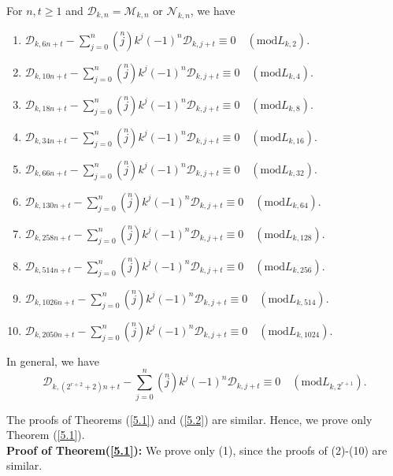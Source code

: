 \begin{theorem}For $n, t\geq 1$ and $\mathcal{D}_{k,n}=\mathcal{M}_{k,n}$ or $\mathcal{N}_{k,n}$, we have\label{5.2}
\begin{enumerate}
\item $\mathcal{D}_{k,6n+t}-\sum\limits_{j=0}^{n}\left( \stackrel{n}{j}\right) k^{j}(-1)^{n} \mathcal{D}_{k,j+t}\equiv 0\quad (\text{mod} L_{k,2}) $.
\item $\mathcal{D}_{k,10n+t}-\sum\limits_{j=0}^{n}\left( \stackrel{n}{j}\right) k^{j}(-1)^{n} \mathcal{D}_{k,j+t}\equiv 0\quad (\text{mod} L_{k,4}) $.
\item $\mathcal{D}_{k,18n+t}-\sum\limits_{j=0}^{n}\left( \stackrel{n}{j}\right) k^{j}(-1)^{n} \mathcal{D}_{k,j+t}\equiv 0\quad (\text{mod} L_{k,8}) $.
\item $\mathcal{D}_{k,34n+t}-\sum\limits_{j=0}^{n}\left( \stackrel{n}{j}\right) k^{j}(-1)^{n} \mathcal{D}_{k,j+t}\equiv 0\quad (\text{mod} L_{k,16}) $.
\item $\mathcal{D}_{k,66n+t}-\sum\limits_{j=0}^{n}\left( \stackrel{n}{j}\right) k^{j}(-1)^{n} \mathcal{D}_{k,j+t}\equiv 0\quad (\text{mod} L_{k,32}) $.
\item $\mathcal{D}_{k,130n+t}-\sum\limits_{j=0}^{n}\left( \stackrel{n}{j}\right) k^{j}(-1)^{n} \mathcal{D}_{k,j+t}\equiv 0\quad (\text{mod} L_{k,64}) $.
\item $\mathcal{D}_{k,258n+t}-\sum\limits_{j=0}^{n}\left( \stackrel{n}{j}\right) k^{j}(-1)^{n} \mathcal{D}_{k,j+t}\equiv 0\quad (\text{mod} L_{k,128}) $.
\item $\mathcal{D}_{k,514n+t}-\sum\limits_{j=0}^{n}\left( \stackrel{n}{j}\right) k^{j}(-1)^{n} \mathcal{D}_{k,j+t}\equiv 0\quad (\text{mod} L_{k,256}) $.
\item $\mathcal{D}_{k,1026n+t}-\sum\limits_{j=0}^{n}\left( \stackrel{n}{j}\right) k^{j}(-1)^{n} \mathcal{D}_{k,j+t}\equiv 0\quad (\text{mod} L_{k,514}) $.
\item $\mathcal{D}_{k,2050n+t}-\sum\limits_{j=0}^{n}\left( \stackrel{n}{j}\right) k^{j}(-1)^{n} \mathcal{D}_{k,j+t}\equiv 0\quad (\text{mod} L_{k,1024}) $.
\end{enumerate}
In general, we have
$$\mathcal{D}_{k,(2^{r+2}+2)n+t}-\sum\limits_{j=0}^{n}\left( \stackrel{n}{j}\right) k^{j}(-1)^{n}\mathcal{D}_{k,j+t}\equiv 0\quad (\text{mod} L_{k,2^{r+1}}). $$
\end{theorem}
\noindent The proofs of Theorems (\ref{5.1}) and (\ref{5.2}) are similar. Hence, we prove only Theorem (\ref{5.1}).\\
\textbf{Proof of Theorem(\ref{5.1}):} We prove only (1), since the proofs of (2)-(10) are similar.\\

